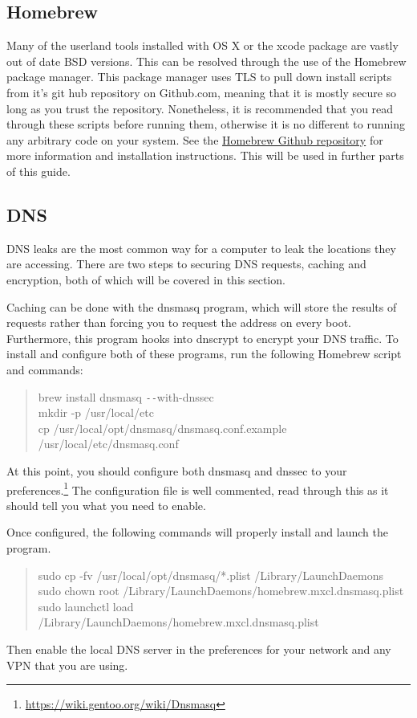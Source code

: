 \documentclass[a4paper,11pt]{report}
\begin{document}
			\subsection{Homebrew}
				Many of the userland tools installed with OS X or the xcode package are vastly out of date BSD versions. 
				This can be resolved through the use of the Homebrew package manager. 
				This package manager uses TLS to pull down install scripts from it's git hub repository on Github.com, meaning that it is mostly secure so long as you trust the repository. 
				Nonetheless, it is recommended that you read through these scripts before running them, otherwise it is no different to running any arbitrary code on your system. 
				See the \href{https://github.com/Homebrew/homebrew}{Homebrew Github repository} for more information and installation instructions. 
				This will be used in further parts of this guide.
			\subsection{DNS}
				DNS leaks are the most common way for a computer to leak the locations they are accessing. 
				There are two steps to securing DNS requests, caching and encryption, both of which will be covered in this section. 

				Caching can be done with the dnsmasq program, which will store the results of requests rather than forcing you to request the address on every boot. 
				Furthermore, this program hooks into dnscrypt to encrypt your DNS traffic. 
				To install and configure both of these programs, run the following Homebrew script and commands:
				\begin{quote}
					brew install dnsmasq \verb+--+with-dnssec \\
					mkdir -p /usr/local/etc \\
					cp /usr/local/opt/dnsmasq/dnsmasq.conf.example /usr/local/etc/dnsmasq.conf \\ %
				\end{quote}
				At this point, you should configure both dnsmasq and dnssec to your preferences.\footnote{\url{https://wiki.gentoo.org/wiki/Dnsmasq}}	
				The configuration file is well commented, read through this as it should tell you what you need to enable. 

				Once configured, the following commands will properly install and launch the program. 
				\begin{quote}
					sudo cp -fv /usr/local/opt/dnsmasq/*.plist /Library/LaunchDaemons \\
					sudo chown root /Library/LaunchDaemons/homebrew.mxcl.dnsmasq.plist \\
					sudo launchctl load /Library/LaunchDaemons/homebrew.mxcl.dnsmasq.plist \\
				\end{quote}
				Then enable the local DNS server in the preferences for your network and any VPN that you are using. 
\end{document}
